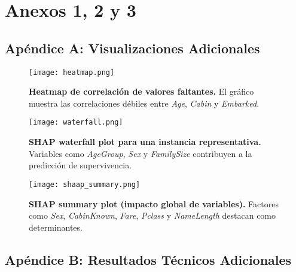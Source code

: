 \documentclass[conference]{IEEEtran}
\begin{document}
\newpage

\printbibliography[heading=bibintoc, title={Referencias}]

\newpage


\appendix

\vspace{-2cm}

\section*{Anexos 1, 2 y 3}

\vspace{-2cm}

\subsection*{Apéndice A: Visualizaciones Adicionales}

\begin{figure}[H]
  \centering
  \texttt{[image: heatmap.png]}
  \caption{\textbf{Heatmap de correlación de valores faltantes.}
  El gráfico muestra las correlaciones débiles entre \textit{Age}, \textit{Cabin} y \textit{Embarked}.}
  \label{fig:appendix-heatmap}
\end{figure}

\begin{figure}[H]
  \centering
  \texttt{[image: waterfall.png]}
  \caption{\textbf{SHAP waterfall plot para una instancia representativa.}
  Variables como \textit{AgeGroup}, \textit{Sex} y \textit{FamilySize} contribuyen a la predicción de supervivencia.}
  \label{fig:appendix-waterfall}
\end{figure}

\begin{figure}[H]
  \centering
  \texttt{[image: shaap\_summary.png]} %
  \caption{\textbf{SHAP summary plot (impacto global de variables).}
  Factores como \textit{Sex}, \textit{CabinKnown}, \textit{Fare}, \textit{Pclass} y \textit{NameLength} destacan como determinantes.}
  \label{fig:appendix-shap-summary}
\end{figure}

\subsection*{Apéndice B: Resultados Técnicos Adicionales}
\end{document}
